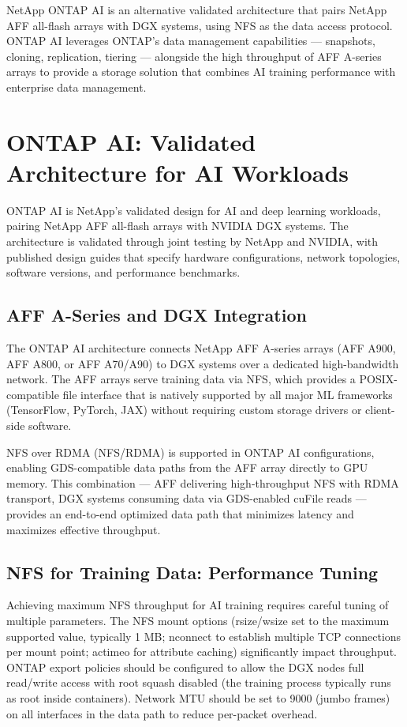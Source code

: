 NetApp ONTAP AI is an alternative validated architecture that pairs NetApp AFF all-flash arrays with DGX systems, using NFS as the data access protocol. ONTAP AI leverages ONTAP's data management capabilities --- snapshots, cloning, replication, tiering --- alongside the high throughput of AFF A-series arrays to provide a storage solution that combines AI training performance with enterprise data management.

\section{ONTAP AI: Validated Architecture for AI Workloads}

ONTAP AI is NetApp's validated design for AI and deep learning workloads, pairing NetApp AFF all-flash arrays with NVIDIA DGX systems. The architecture is validated through joint testing by NetApp and NVIDIA, with published design guides that specify hardware configurations, network topologies, software versions, and performance benchmarks.

\subsection{AFF A-Series and DGX Integration}

The ONTAP AI architecture connects NetApp AFF A-series arrays (AFF A900, AFF A800, or AFF A70/A90) to DGX systems over a dedicated high-bandwidth network. The AFF arrays serve training data via NFS, which provides a POSIX-compatible file interface that is natively supported by all major ML frameworks (TensorFlow, PyTorch, JAX) without requiring custom storage drivers or client-side software.

NFS over RDMA (NFS/RDMA) is supported in ONTAP AI configurations, enabling GDS-compatible data paths from the AFF array directly to GPU memory. This combination --- AFF delivering high-throughput NFS with RDMA transport, DGX systems consuming data via GDS-enabled cuFile reads --- provides an end-to-end optimized data path that minimizes latency and maximizes effective throughput.

\subsection{NFS for Training Data: Performance Tuning}

Achieving maximum NFS throughput for AI training requires careful tuning of multiple parameters. The NFS mount options (rsize/wsize set to the maximum supported value, typically 1 MB; nconnect to establish multiple TCP connections per mount point; actimeo for attribute caching) significantly impact throughput. ONTAP export policies should be configured to allow the DGX nodes full read/write access with root squash disabled (the training process typically runs as root inside containers). Network MTU should be set to 9000 (jumbo frames) on all interfaces in the data path to reduce per-packet overhead.

